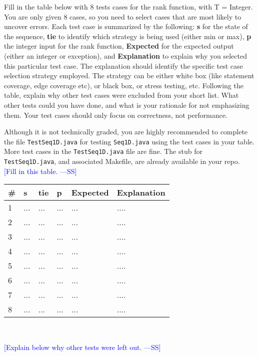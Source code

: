 \documentclass[12pt,fleqn]{examtst}
\newcommand{\authornote}[3]{\textcolor{#1}{[#3 ---#2]}}
\newcommand{\authornote}[3]{}
\newcommand{\wss}[1]{\authornote{blue}{SS}{#1}}
\begin{document}
\noindent
\begin{minipage}{\textwidth}
 \label{Q_TestTable}

Fill in the table below with 8 tests cases for the rank function, with T =
Integer.  You are only given 8 cases, so you need to select cases that are most
likely to uncover errors.  Each test case is summarized by the following:
\textbf{s} for the state of the sequence, \textbf{tie} to identify which
strategy is being used (either min or max), \textbf{p} the integer input for the
rank function, \textbf{Expected} for the expected output (either an integer or
exception), and \textbf{Explanation} to explain why you selected this particular
test case.  The explanation should identify the specific test case selection
strategy employed.  The strategy can be either white box (like statement
coverage, edge coverage etc), or black box, or stress testing, etc.  Following
the table, explain why other test cases were excluded from your short list.  What
other tests could you have done, and what is your rationale for not emphasizing
them.  Your test cases should only focus on correctness, not performance.

Although it is not technically graded, you are highly recommended to complete
the file \texttt{TestSeq1D.java} for testing \texttt{Seq1D.java} using the test
cases in your table.  More test cases in the \texttt{TestSeq1D.java} file are
fine.  The stub for \texttt{TestSeq1D.java}, and associated Makefile, are already available in
your repo.\\

\wss{Fill in this table.}\\

\begin{tabular}{ p{0.75cm}  l  l  l  l p{9cm} }
  \toprule
  \textbf{\#} & \textbf{s} & \textbf{tie} & \textbf{p} & \textbf{Expected} & \textbf{Explanation}\\
  \midrule
  1 & ... & ... & ... & ... & ....\\
  2 & ... & ... & ... & ... & ....\\
  3 & ... & ... & ... & ... & ....\\
  4 & ... & ... & ... & ... & ....\\
  5 & ... & ... & ... & ... & ....\\
  6 & ... & ... & ... & ... & ....\\
  7 & ... & ... & ... & ... & ....\\
  8 & ... & ... & ... & ... & ....\\
  \bottomrule
\end{tabular}\\
\medskip

\wss{Explain below why other tests were left out.}\\

\end{minipage}
\end{document}
